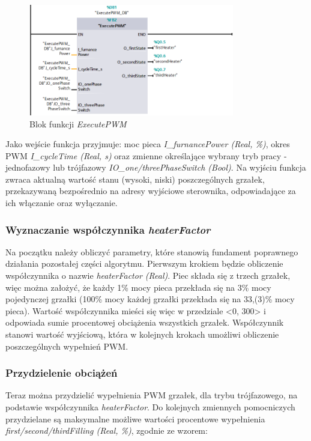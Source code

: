 \documentclass[a4paper,twoside,12pt]{book}
\begin{document}
\begin{figure}[h]
	\centering
	\includegraphics[width=0.8\textwidth]{./img/ExecutePWM.png}
	\caption{Blok funkcji \textit{ExecutePWM}}
	\label{fig:ExecutePWM}
\end{figure}

Jako wejście funkcja przyjmuje: moc pieca \textit{I\_furnancePower (Real, \%)}, okres PWM \textit{I\_cycleTime (Real, s)} oraz zmienne określające wybrany tryb pracy - jednofazowy lub trójfazowy \textit{IO\_one/threePhaseSwitch (Bool)}. Na wyjściu funkcja zwraca aktualną wartość stanu (wysoki, niski) poszczególnych grzałek, przekazywaną bezpośrednio na adresy wyjściowe sterownika, odpowiadające za ich włączanie oraz wyłączanie.

\subsubsection{Wyznaczanie współczynnika \textit{heaterFactor}}
Na początku należy obliczyć parametry, które stanowią fundament poprawnego działania pozostałej części algorytmu. Pierwszym krokiem będzie obliczenie współczynnika o nazwie \textit{heaterFactor (Real)}. Piec składa się z trzech grzałek, więc można założyć, że każdy 1\% mocy pieca przekłada się na 3\% mocy pojedynczej grzałki (100\% mocy każdej grzałki przekłada się na 33,(3)\% mocy pieca). Wartość współczynnika mieści się więc w przedziale <0, 300> i odpowiada sumie procentowej obciążenia wszystkich grzałek. Współczynnik stanowi wartość wyjściową, która w kolejnych krokach umożliwi obliczenie poszczególnych wypełnień PWM.

\newpage
\subsubsection{Przydzielenie obciążeń}
Teraz można przydzielić wypełnienia PWM grzałek, dla trybu trójfazowego, na podstawie współczynnika \textit{heaterFactor}. Do kolejnych zmiennych pomocniczych przydzielane są maksymalne możliwe wartości procentowe wypełnienia \textit{first/second/thirdFilling (Real, \%)}, zgodnie ze wzorem:
\end{document}
